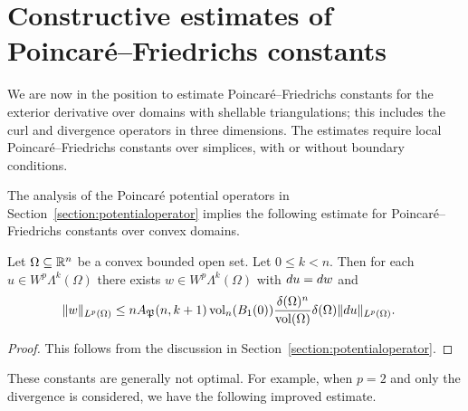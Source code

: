 \documentclass[10pt,letterpaper]{article}
\begin{document}
\section{Constructive estimates of Poincar\'e--Friedrichs constants}\label{section:poincarefriedrichs}

We are now in the position to estimate Poincar\'e--Friedrichs constants for the exterior derivative over domains with shellable triangulations; this includes the curl and divergence operators in three dimensions. 
The estimates require local Poincar\'e--Friedrichs constants over simplices, 
with or without boundary conditions. 

The analysis of the Poincar\'e potential operators in Section~\ref{section:potentialoperator}
implies the following estimate for Poincar\'e--Friedrichs constants over convex domains. 


\begin{lemma}\label{lemma:PFexteriorsimplex}
    Let $\Omega \subseteq {\mathbb R}^{n}$ be a convex bounded open set. 
    Let $0 \leq k < n$. 
    Then for each $u \in W^{p}\Lambda^{k}(\Omega)$ 
    there exists $w \in W^{p}\Lambda^{k}(\Omega)$ 
    with $d u = d w$ and 
    \begin{align*}
        \| w \|_{L^{p}(\Omega)}
        &
        \leq 
        n A_{{\mathfrak P}}(n,k+1) 
        \operatorname{vol}_{n}(B_1(0)) 
        \frac{ {\delta}(\Omega)^{n} }{ \operatorname{vol}(\Omega) } 
        {\delta}(\Omega)
        \| d u \|_{L^{p}(\Omega)}
        .
    \end{align*}
\end{lemma}
\begin{proof}
    This follows from the discussion in Section~\ref{section:potentialoperator}.
\end{proof}

These constants are generally not optimal. 
For example, when $p=2$ and only the divergence is considered, 
we have the following improved estimate. 
\end{document}
